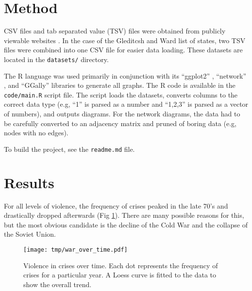 \documentclass[12pt,parskip=half-]{scrartcl}
\begin{document}
\section{Method}

CSV files and tab separated value (TSV) files were obtained from publicly
viewable websites \cite{ucdpconflictsdataset, gwstatesdataset, icbdataset}. In
the case of the Gleditcsh and Ward list of states, two TSV files were combined
into one CSV file for easier data loading.  These datasets are located in the
\texttt{datasets/} directory.

The R language \cite{r} was used primarily in conjunction with its ``ggplot2''
\cite{ggplot2}, ``network'' \cite{networkmanual, networkarticle}, and
``GGally'' \cite{ggally} libraries to generate all graphs. The R code is
available in the \texttt{code/main.R} script file. The script loads the datasets,
converts columns to the correct data type (e.g, ``1'' is parsed as a number and
``1,2,3'' is parsed as a vector of numbers), and outputs diagrams.  For the
network diagrams, the data had to be carefully converted to an adjacency matrix
and pruned of boring data (e.g, nodes with no edges).

To build the project, see the \texttt{readme.md} file.

\section{Results}

\begin{minipage}{\textwidth}
    For all levels of violence, the frequency of crises peaked in the late 70's
    and drastically dropped afterwards (Fig \ref{war_over_time.pdf}). There are
    many possible reasons for this, but the most obvious candidate is the
    decline of the Cold War and the collapse of the Soviet Union.

    \begin{figure}
        \centering
        \texttt{[image: tmp/war\_over\_time.pdf]}
        \caption{Violence in crises over time. Each dot represents the
            frequency of crises for a particular year. A Loess curve is fitted
        to the data to show the overall trend.}
        \label{war_over_time.pdf}
    \end{figure}
\end{minipage}
\end{document}

